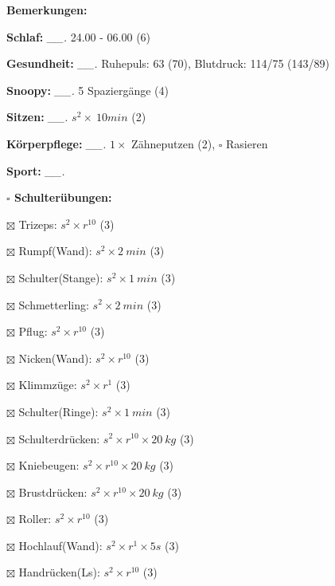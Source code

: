 \documentclass[10pt,a4paper]{article}
\newcommand\prop[1] {{\color {alizarin} {\bf #1}}}             %
\newcommand\mand[1] {{\color {burntorange} {\bf #1}}}          %
\newcommand\topspace{\vskip -15pt \hskip 20pt}
\newcommand\n[1] { {\sl #1.} \hskip 5pt }
\begin{document}
\begin{mdframed}[style=daystyle]
  \begin{labeling}{{\mand {Bemerkungen:}}}
    \setlength\itemsep{-3pt}
  \item[{\mand {Schlaf:}}]        \n{\_\_} 24.00 - 06.00 (6)
  \item[{\mand {Gesundheit:}}]    \n{\_\_} Ruhepuls: 63 (70), Blutdruck: 114/75 (143/89)
  \item[{\mand {Snoopy:}}]        \n{\_\_} 5 Spaziergänge (4)
  \item[{\mand {Sitzen:}}]        \n{\_\_} $s^2 \times\ 10 min$ (2)
  \item[{\mand {Körperpflege:}}]  \n{\_\_} $1 \times$ Zähneputzen (2), $\square$ Rasieren
  \item[{\mand {Sport:}}]         \n{\_\_}
    \topspace
    \begin{minipage}{0.75\textwidth}  
      \begin{labeling}{\prop {$\square$ {Schulterübungen:}}} 
        \setlength\itemsep{-3pt}
      \item[$\boxtimes$ Trizeps:]          $s^2 \times r^{10}$ (3)
      \item[$\boxtimes$ Rumpf(Wand):]      $s^2 \times 2\ min$ (3)
      \item[$\boxtimes$ Schulter(Stange):] $s^2 \times 1\ min$ (3)
      \item[$\boxtimes$ Schmetterling:]    $s^2 \times 2\ min$ (3)
      \item[$\boxtimes$ Pflug:]            $s^2 \times r^{10}$ (3)
      \item[$\boxtimes$ Nicken(Wand):]     $s^2 \times r^{10}$ (3)
      \item[$\boxtimes$ Klimmzüge:]        $s^2 \times r^1$ (3)
      \item[$\boxtimes$ Schulter(Ringe):]  $s^2 \times 1\ min$ (3)
      \item[$\boxtimes$ Schulterdrücken:]  $s^2 \times r^{10} \times 20\ kg$ (3)
      \item[$\boxtimes$ Kniebeugen:]       $s^2 \times r^{10} \times 20\ kg$ (3)
      \item[$\boxtimes$ Brustdrücken:]     $s^2 \times r^{10} \times 20\ kg$ (3)
      \item[$\boxtimes$ Roller:]           $s^2 \times r^{10}$ (3)
      \item[$\boxtimes$ Hochlauf(Wand):]   $s^2 \times r^{1} \times 5s$ (3)
      \item[$\boxtimes$ Handrücken(Ls):]   $s^2 \times r^{10}$ (3)

\end{labeling}
\end{minipage}
\end{labeling}
\end{mdframed}
\end{document}
